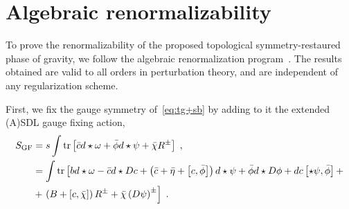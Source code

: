 \documentclass[../main.tex]{subfiles}
\begin{document}
\section{Algebraic renormalizability}%
\label{sec:quantum}

To prove the renormalizability of the proposed topological symmetry-restaured phase of gravity, we follow the algebraic renormalization program~\cite{piguet1995b}. The results obtained are valid to all orders in perturbation theory, and are independent of any regularization scheme.

First, we fix the gauge symmetry of~\eqref{eq:tg+sb} by adding to it the extended (A)SDL gauge fixing action,
\begin{subequations}%
  \label{eq:tg-gf-action}
  \begin{align}
    S_{\text{GF}} & = s \int \operatorname{tr} \left[ \bar{c} d \star \omega + \bar{\phi} d \star \psi + \bar{\chi} R^{\pm} \right] \;,                                                                                                                                \\
                  & = \int \operatorname{tr} \left[ b d \star \omega - \bar{c} d \star Dc + \left( \bar{c} + \bar{\eta} + \left[ c,\bar{\phi} \right] \right) d \star \psi + \bar{\phi} d \star D \phi + d c \left[ \star \psi ,\bar{\phi} \right] + \right. \nonumber \\
                  & + \left. \left( B + \left[ c,\bar{\chi} \right] \right) R^{\pm} + \bar{\chi} \left( D \psi \right)^{\pm} \right] \;.
  \end{align}
\end{subequations}
\end{document}
